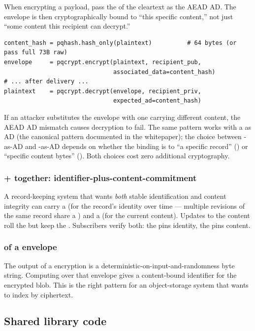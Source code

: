 When encrypting a payload, pass the \pqhash{} of the cleartext as the AEAD AD. The \pqcrypt{} envelope is then cryptographically bound to ``this specific content,'' not just ``some content this recipient can decrypt.''

\begin{lstlisting}[language=Pseudocode]
content_hash = pqhash.hash_only(plaintext)          # 64 bytes (or pass full 73B raw)
envelope     = pqcrypt.encrypt(plaintext, recipient_pub,
                               associated_data=content_hash)
# ... after delivery ...
plaintext    = pqcrypt.decrypt(envelope, recipient_priv,
                               expected_ad=content_hash)
\end{lstlisting}

If an attacker substitutes the envelope with one carrying different content, the AEAD AD mismatch causes decryption to fail. The same pattern works with a \pqid{} as AD (the canonical pattern documented in the \pqcrypt{} whitepaper); the choice between \pqid{}-as-AD and \pqhash{}-as-AD depends on whether the binding is to ``a specific record'' (\pqid{}) or ``specific content bytes'' (\pqhash{}). Both choices cost zero additional cryptography.

\subsubsection{\pqid{} + \pqhash{} together: identifier-plus-content-commitment}

A record-keeping system that wants \emph{both} stable identification and content integrity can carry a \pqid{} (for the record's identity over time --- multiple revisions of the same record share a \pqid{}) and a \pqhash{} (for the current content). Updates to the content roll the \pqhash{} but keep the \pqid{}. Subscribers verify both: the \pqid{} pins identity, the \pqhash{} pins content.

\subsubsection{\pqhash{} of a \pqcrypt{} envelope}

The output of a \pqcrypt{} encryption is a deterministic-on-input-and-randomness byte string. Computing \pqhash{} over that envelope gives a content-bound identifier for the encrypted blob. This is the right pattern for an object-storage system that wants to index by ciphertext.

\subsection{Shared library code}

